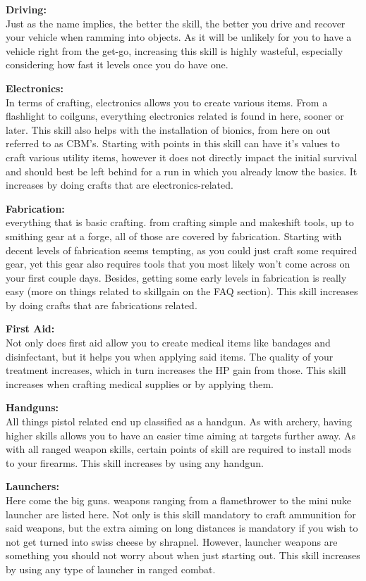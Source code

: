 \textbf{Driving:}\\Just as the name implies, the better the skill, the better you drive and recover your vehicle when ramming into objects. As it will be unlikely for you to have a vehicle right from the get-go, increasing this skill is highly wasteful, especially considering how fast it levels once you do have one.

\textbf{Electronics:}\\In terms of crafting, electronics allows you to create various items. From a flashlight to coilguns, everything electronics related is found in here, sooner or later. This skill also helps with the installation of bionics, from here on out referred to as CBM's. Starting with points in this skill can have it's values to craft various utility items, however it does not directly impact the initial survival and should best be left behind for a run in which you already know the basics. It increases by doing crafts that are electronics-related.

\textbf{Fabrication:}\\everything that is basic crafting. from crafting simple and makeshift tools, up to smithing gear at a forge, all of those are covered by fabrication. Starting with decent levels of fabrication seems tempting, as you could just craft some required gear, yet this gear also requires tools that you most likely won't come across on your first couple days. Besides, getting some early levels in fabrication is really easy (more on things related to skillgain on the FAQ section). This skill increases by doing crafts that are fabrications related.

\textbf{First Aid:}\\Not only does first aid allow you to create medical items like bandages and disinfectant, but it helps you when applying said items. The quality of your treatment increases, which in turn increases the HP gain from those. This skill increases when crafting medical supplies or by applying them.

\textbf{Handguns:}\\All things pistol related end up classified as a handgun. As with archery, having higher skills allows you to have an easier time aiming at targets further away. As with all ranged weapon skills, certain points of skill are required to install mods to your firearms. This skill increases by using any handgun.

\textbf{Launchers:}\\Here come the big guns. weapons ranging from a flamethrower to the mini nuke launcher are listed here. Not only is this skill mandatory to craft ammunition for said weapons, but the extra aiming on long distances is mandatory if you wish to not get turned into swiss cheese by shrapnel. However, launcher weapons are something you should not worry about when just starting out. This skill increases by using any type of launcher in ranged combat.

